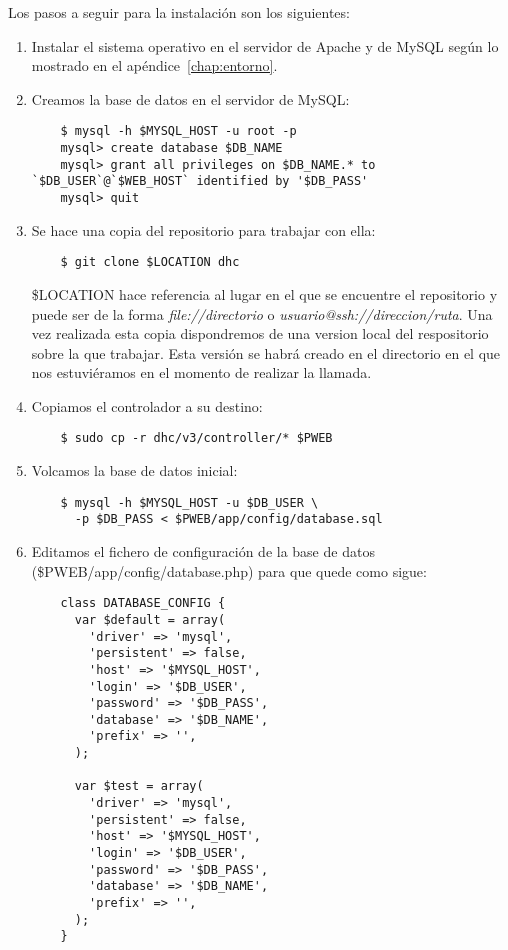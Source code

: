 Los pasos a seguir para la instalación son los siguientes:

\begin{enumerate}
	\item Instalar el sistema operativo en el servidor de Apache y de MySQL según lo mostrado en el apéndice~\ref{chap:entorno}.
	
	\item Creamos la base de datos en el servidor de MySQL:
	
	\begin{verbatim}
	$ mysql -h $MYSQL_HOST -u root -p
	mysql> create database $DB_NAME
	mysql> grant all privileges on $DB_NAME.* to `$DB_USER`@`$WEB_HOST` identified by '$DB_PASS'
	mysql> quit
	\end{verbatim}

	\item Se hace una copia del repositorio para trabajar con ella:
	
	\begin{verbatim}
	$ git clone $LOCATION dhc
	\end{verbatim}
	
	\$LOCATION hace referencia al lugar en el que se encuentre el repositorio y puede ser de la forma \emph{file://directorio} o \emph{usuario@ssh://direccion/ruta}. Una vez realizada esta copia dispondremos de una version local del respositorio sobre la que trabajar. Esta versión se habrá creado en el directorio en el que nos estuviéramos en el momento de realizar la llamada.

	\item Copiamos el controlador a su destino:
	
	\begin{verbatim}
	$ sudo cp -r dhc/v3/controller/* $PWEB
	\end{verbatim}
	
	\item Volcamos la base de datos inicial:
	
	\begin{verbatim}
	$ mysql -h $MYSQL_HOST -u $DB_USER \
	  -p $DB_PASS < $PWEB/app/config/database.sql
	\end{verbatim}
	
	\item Editamos el fichero de configuración de la base de datos (\$PWEB/app/config/database.php) para que quede como sigue:
	
	\begin{verbatim}
	class DATABASE_CONFIG {
	  var $default = array(
	    'driver' => 'mysql',
	    'persistent' => false,
	    'host' => '$MYSQL_HOST',
	    'login' => '$DB_USER',
	    'password' => '$DB_PASS',
	    'database' => '$DB_NAME',
	    'prefix' => '',
	  );

	  var $test = array(
	    'driver' => 'mysql',
	    'persistent' => false,
	    'host' => '$MYSQL_HOST',
	    'login' => '$DB_USER',
	    'password' => '$DB_PASS',
	    'database' => '$DB_NAME',
	    'prefix' => '',
	  );
	}
	\end{verbatim}
\end{enumerate}	

